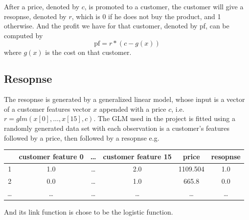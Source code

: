 \documentclass[11pt]{article}
\begin{document}
\noindent After a price, denoted by \(c\), is promoted to a customer, the 
customer will give a resopnse, denoted by \(r\), which is 0 if he does not buy
the product, and 1 otherwise. And the profit we have for that customer, 
denoted by pf, can be computed by
\[\text{pf} = r*\left(c - g(x)\right)\]
where \(g(x)\) is the cost on that customer.

\subsection{Resopnse}
The resopnse is generated by a generalized linear model, whose input is a 
vector of a customer features vector \(x\) appended with a price \(c\), i.e.
\(r=glm(x[0], \dots, x[15], c)\).
\vspace{3mm}\newline The GLM used in the project is fitted using a randomly
generated data set with each observation is a customer's features followed by 
a price, then followed by a resopnse e.g.
\begin{table}[htpb]
    \centering
    \begin{tabular}{c|c|c|c|c|c}
        & customer feature 0 & \dots & customer feature 15 & price & resopnse\\
        \hline
        1 & 1.0 & \dots & 2.0 & 1109.504 & 1.0\\
        \hline
        2 & 0.0 & \dots & 1.0 & 665.8 & 0.0\\
        \hline
        \dots & \dots & \dots & \dots & \dots & \dots
    \end{tabular}
\end{table}

\noindent And its link function is chose to be the logistic function.
\end{document}
